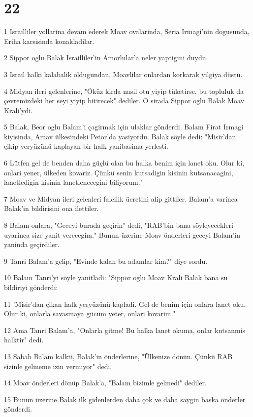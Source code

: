\chapter{22}

\par 1 Israilliler yollarina devam ederek Moav ovalarinda, Seria Irmagi'nin dogusunda, Eriha karsisinda konakladilar.
\par 2 Sippor oglu Balak Israilliler'in Amorlular'a neler yaptigini duydu.
\par 3 Israil halki kalabalik oldugundan, Moavlilar onlardan korkarak yilgiya düstü.
\par 4 Midyan ileri gelenlerine, "Öküz kirda nasil otu yiyip tüketirse, bu topluluk da çevremizdeki her seyi yiyip bitirecek" dediler. O sirada Sippor oglu Balak Moav Krali'ydi.
\par 5 Balak, Beor oglu Balam'i çagirmak için ulaklar gönderdi. Balam Firat Irmagi kiyisinda, Amav ülkesindeki Petor'da yasiyordu. Balak söyle dedi: "Misir'dan çikip yeryüzünü kaplayan bir halk yanibasima yerlesti.
\par 6 Lütfen gel de benden daha güçlü olan bu halka benim için lanet oku. Olur ki, onlari yener, ülkeden kovariz. Çünkü senin kutsadigin kisinin kutsanacagini, lanetledigin kisinin lanetlenecegini biliyorum."
\par 7 Moav ve Midyan ileri gelenleri falcilik ücretini alip gittiler. Balam'a varinca Balak'in bildirisini ona ilettiler.
\par 8 Balam onlara, "Geceyi burada geçirin" dedi, "RAB'bin bana söyleyecekleri uyarinca size yanit verecegim." Bunun üzerine Moav önderleri geceyi Balam'in yaninda geçirdiler.
\par 9 Tanri Balam'a gelip, "Evinde kalan bu adamlar kim?" diye sordu.
\par 10 Balam Tanri'yi söyle yanitladi: "Sippor oglu Moav Krali Balak bana su bildiriyi gönderdi:
\par 11 'Misir'dan çikan halk yeryüzünü kapladi. Gel de benim için onlara lanet oku. Olur ki, onlarla savasmaya gücüm yeter, onlari kovarim."
\par 12 Ama Tanri Balam'a, "Onlarla gitme! Bu halka lanet okuma, onlar kutsanmis halktir" dedi.
\par 13 Sabah Balam kalkti, Balak'in önderlerine, "Ülkenize dönün. Çünkü RAB sizinle gelmeme izin vermiyor" dedi.
\par 14 Moav önderleri dönüp Balak'a, "Balam bizimle gelmedi" dediler.
\par 15 Bunun üzerine Balak ilk gidenlerden daha çok ve daha saygin baska önderler gönderdi.
